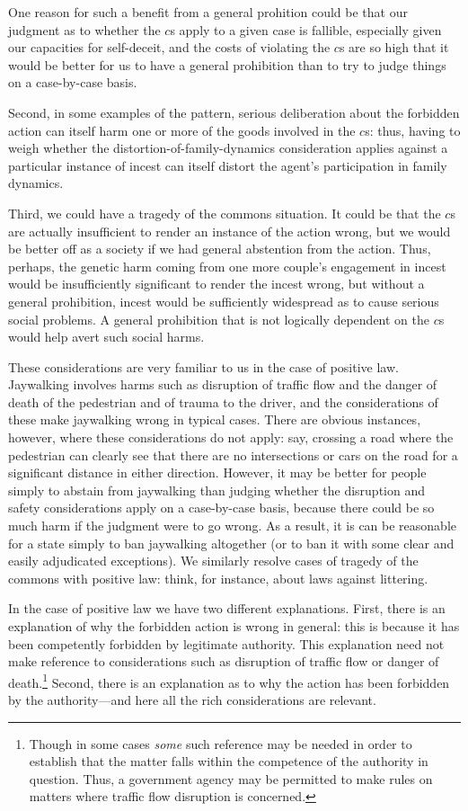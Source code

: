 One reason for such a benefit from a general prohition could be that our judgment as to whether the $c$s apply to a given case is fallible, especially given our capacities
for self-deceit, and the costs of violating the $c$s are so high that it would be better for us to have a 
general prohibition than to try to judge things on a case-by-case basis. 

Second, in some examples of
the pattern, serious deliberation about the forbidden action can itself harm one or more of the goods
involved in the $c$s: thus, having to weigh whether the distortion-of-family-dynamics consideration
applies against a particular instance of incest can itself distort the agent's participation in family
dynamics. 

Third, we could have a tragedy of the commons situation. It could be that the $c$s are actually insufficient
to render an instance of the action wrong, but we would be better off as a society if we had general
abstention from the action. Thus, perhaps, the genetic harm coming from one more couple's engagement in incest
would be insufficiently significant to render the incest wrong, but without a general prohibition, incest
would be sufficiently widespread as to cause serious social problems. A general prohibition that is not
logically dependent on the $c$s would help avert such social harms.

These considerations are very familiar to us in the case of positive law. Jaywalking involves harms such as
disruption of traffic flow and the danger of death of the pedestrian and of trauma to the driver, and the
considerations of these make jaywalking wrong in typical cases. There are 
obvious instances, however, where these considerations do not apply: say, crossing a road where the pedestrian
can clearly see that there are no intersections or cars on the road for a significant distance in either 
direction. However, it may be better for people simply to abstain from jaywalking than judging whether the 
disruption and safety considerations apply on a case-by-case basis, because there could be so much harm if 
the judgment were to go wrong. As a result, it is can be reasonable for a state simply to ban jaywalking
altogether (or to ban it with some clear and easily adjudicated exceptions). We similarly resolve cases of
tragedy of the commons with positive law: think, for instance, about laws against littering.

In the case of positive law we have two different explanations. First, there is an explanation of why
the forbidden action is wrong in general: this is because it has been competently forbidden by legitimate authority.
This explanation need not make reference to considerations such as disruption of traffic flow or danger
of death.\footnote{Though in some cases \textit{some} such reference may be needed in order to establish
that the matter falls within the competence of the authority in question. Thus, a government agency may
be permitted to make rules on matters where traffic flow disruption is concerned.} Second, there is an 
explanation as to why the action has been forbidden by the authority---and here all the rich considerations
are relevant.

